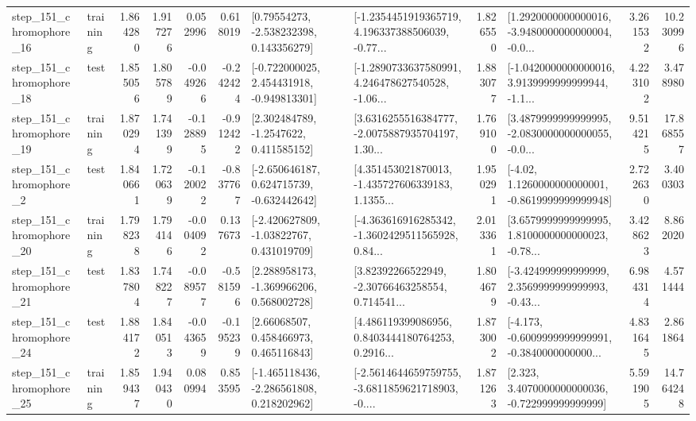 \begin{tabular}{llrrrrllrlrr}
  step\_151\_chromophore\_16 &  training &      1.864280 &    1.917276 &      0.052996 &  0.618019 &     [0.79554273, -2.538232398, 0.143356279] &  [-1.2354451919365719, 4.196337388506039, -0.77... &       1.826550 &  [1.2920000000000016, -3.9480000000000004, -0.0... &            3.261532 &         10.230996 \\
  step\_151\_chromophore\_18 &      test &      1.855056 &    1.805789 &     -0.049266 & -0.242424 &   [-0.722000025, 2.454431918, -0.949813301] &  [-1.2890733637580991, 4.246478627540528, -1.06... &       1.883077 &  [-1.0420000000000016, 3.9139999999999944, -1.1... &            4.223102 &          3.478980 \\
  step\_151\_chromophore\_19 &  training &      1.870294 &    1.741399 &     -0.128895 & -0.912422 &      [2.302484789, -1.2547622, 0.411585152] &  [3.6316255516384777, -2.0075887935704197, 1.30... &       1.769100 &  [3.4879999999999995, -2.0830000000000055, -0.0... &            9.514215 &         17.868557 \\
   step\_151\_chromophore\_2 &      test &      1.840661 &    1.720639 &     -0.120022 & -0.837767 &   [-2.650646187, 0.624715739, -0.632442642] &  [4.351453021870013, -1.435727606339183, 1.1355... &       1.950291 &   [-4.02, 1.1260000000000001, -0.8619999999999948] &            2.722630 &          3.400303 \\
  step\_151\_chromophore\_20 &  training &      1.798238 &    1.794146 &     -0.004092 &  0.137673 &    [-2.420627809, -1.03822767, 0.431019709] &  [-4.363616916285342, -1.3602429511565928, 0.84... &       2.013361 &  [3.6579999999999995, 1.8100000000000023, -0.78... &            3.428623 &          8.862020 \\
  step\_151\_chromophore\_21 &      test &      1.837804 &    1.748227 &     -0.089577 & -0.581596 &    [2.288958173, -1.369966206, 0.568002728] &  [3.82392266522949, -2.30766463258554, 0.714541... &       1.804679 &  [-3.424999999999999, 2.3569999999999993, -0.43... &            6.984314 &          4.571444 \\
  step\_151\_chromophore\_24 &      test &      1.884172 &    1.840513 &     -0.043659 & -0.195239 &      [2.66068507, 0.458466973, 0.465116843] &  [4.486119399086956, 0.8403444180764253, 0.2916... &       1.873002 &  [-4.173, -0.6009999999999991, -0.3840000000000... &            4.831645 &          2.861864 \\
  step\_151\_chromophore\_25 &  training &      1.859437 &    1.940430 &      0.080994 &  0.853595 &   [-1.465118436, -2.286561808, 0.218202962] &  [-2.5614644659759755, -3.6811859621718903, -0.... &       1.871263 &    [2.323, 3.4070000000000036, -0.722999999999999] &            5.591905 &         14.764248 \\

\end{tabular}
